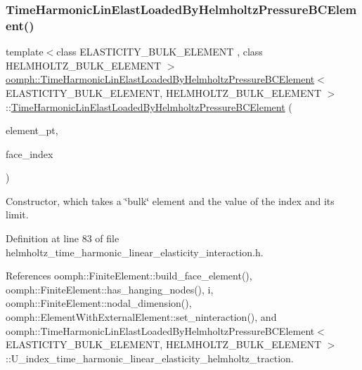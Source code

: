 \subsubsection{\texorpdfstring{Time\+Harmonic\+Lin\+Elast\+Loaded\+By\+Helmholtz\+Pressure\+B\+C\+Element()}{TimeHarmonicLinElastLoadedByHelmholtzPressureBCElement()}}
{\footnotesize\ttfamily template$<$class E\+L\+A\+S\+T\+I\+C\+I\+T\+Y\+\_\+\+B\+U\+L\+K\+\_\+\+E\+L\+E\+M\+E\+NT , class H\+E\+L\+M\+H\+O\+L\+T\+Z\+\_\+\+B\+U\+L\+K\+\_\+\+E\+L\+E\+M\+E\+NT $>$ \\
\hyperlink{classoomph_1_1TimeHarmonicLinElastLoadedByHelmholtzPressureBCElement}{oomph\+::\+Time\+Harmonic\+Lin\+Elast\+Loaded\+By\+Helmholtz\+Pressure\+B\+C\+Element}$<$ E\+L\+A\+S\+T\+I\+C\+I\+T\+Y\+\_\+\+B\+U\+L\+K\+\_\+\+E\+L\+E\+M\+E\+NT, H\+E\+L\+M\+H\+O\+L\+T\+Z\+\_\+\+B\+U\+L\+K\+\_\+\+E\+L\+E\+M\+E\+NT $>$\+::\hyperlink{classoomph_1_1TimeHarmonicLinElastLoadedByHelmholtzPressureBCElement}{Time\+Harmonic\+Lin\+Elast\+Loaded\+By\+Helmholtz\+Pressure\+B\+C\+Element} (\begin{DoxyParamCaption}\item[{\hyperlink{classoomph_1_1FiniteElement}{Finite\+Element} $\ast$const \&}]{element\+\_\+pt,  }\item[{const int \&}]{face\+\_\+index }\end{DoxyParamCaption})\hspace{0.3cm}{\ttfamily [inline]}}



Constructor, which takes a \char`\"{}bulk\char`\"{} element and the value of the index and its limit. 



Definition at line 83 of file helmholtz\+\_\+time\+\_\+harmonic\+\_\+linear\+\_\+elasticity\+\_\+interaction.\+h.



References oomph\+::\+Finite\+Element\+::build\+\_\+face\+\_\+element(), oomph\+::\+Finite\+Element\+::has\+\_\+hanging\+\_\+nodes(), i, oomph\+::\+Finite\+Element\+::nodal\+\_\+dimension(), oomph\+::\+Element\+With\+External\+Element\+::set\+\_\+ninteraction(), and oomph\+::\+Time\+Harmonic\+Lin\+Elast\+Loaded\+By\+Helmholtz\+Pressure\+B\+C\+Element$<$ E\+L\+A\+S\+T\+I\+C\+I\+T\+Y\+\_\+\+B\+U\+L\+K\+\_\+\+E\+L\+E\+M\+E\+N\+T, H\+E\+L\+M\+H\+O\+L\+T\+Z\+\_\+\+B\+U\+L\+K\+\_\+\+E\+L\+E\+M\+E\+N\+T $>$\+::\+U\+\_\+index\+\_\+time\+\_\+harmonic\+\_\+linear\+\_\+elasticity\+\_\+helmholtz\+\_\+traction.



